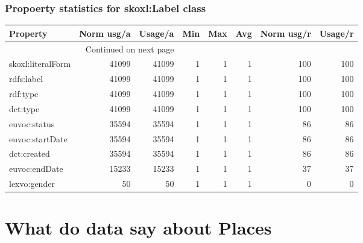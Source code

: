 \documentclass[10pt,a4paper,titlepage,final]{article}
\begin{document}
\subsubsection{Propoerty statistics for skoxl:Label class}
\begin{longtable}{lrrrrrrr}
\toprule
          Property &  Norm usg/a &  Usage/a &  Min &  Max &  Avg &  Norm usg/r &  Usage/r \\
\midrule
\endhead
\midrule
\multicolumn{3}{r}{{Continued on next page}} \\
\midrule
\endfoot

\bottomrule
\endlastfoot
 skoxl:literalForm &       41099 &    41099 &    1 &    1 &    1 &         100 &      100 \\
        rdfs:label &       41099 &    41099 &    1 &    1 &    1 &         100 &      100 \\
          rdf:type &       41099 &    41099 &    1 &    1 &    1 &         100 &      100 \\
          dct:type &       41099 &    41099 &    1 &    1 &    1 &         100 &      100 \\
      euvoc:status &       35594 &    35594 &    1 &    1 &    1 &          86 &       86 \\
   euvoc:startDate &       35594 &    35594 &    1 &    1 &    1 &          86 &       86 \\
       dct:created &       35594 &    35594 &    1 &    1 &    1 &          86 &       86 \\
     euvoc:endDate &       15233 &    15233 &    1 &    1 &    1 &          37 &       37 \\
      lexvo:gender &          50 &       50 &    1 &    1 &    1 &           0 &        0 \\
\end{longtable}


\section{What do data say about Places}
\end{document}
